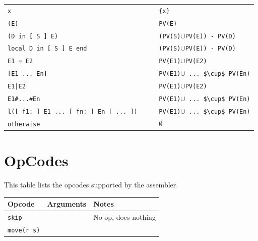 \documentclass[a4paper]{memoir}
\begin{document}
\begin{appendices}
\begin{tabular} {l l}
\lstinline!x                                       ! & \lstinline!{x} !                                   \\
\lstinline!(E)                                     ! & \lstinline!PV(E) !                                    \\
\lstinline!(D in [ S ] E)                          ! & \lstinline[mathescape]!(PV(S)!$\cup$\lstinline!PV(E)) - PV(D) !\\
\lstinline!local D in [ S ] E end                  ! & \lstinline[mathescape]!(PV(S)!$\cup$\lstinline!PV(E)) - PV(D) !\\
\lstinline!E1 = E2                                 ! & \lstinline[mathescape]!PV(E1)!$\cup$\lstinline!PV(E2)         !\\
\lstinline![E1 ... En]                             ! & \lstinline[mathescape]!PV(E1)!$\cup$\lstinline[mathescape]! ... $\cup$ PV(En)!\\
\lstinline!E1|E2                                   ! & \lstinline[mathescape]!PV(E1)!$\cup$\lstinline!PV(E2)         !\\
\lstinline!E1#...#En                             ! & \lstinline[mathescape]!PV(E1)!$\cup$\lstinline[mathescape]! ... $\cup$ PV(En)!\\
\lstinline!l([ f1: ] E1 ... [ fn: ] En [ ... ])    ! & \lstinline[mathescape]!PV(E1)!$\cup$\lstinline[mathescape]! ... $\cup$ PV(En)!\\
\lstinline!otherwise                               ! &              $\emptyset$                               \\
\end{tabular}

\openany

\chapter{OpCodes}\label{appendix:opcodes}
This table lists the opcodes supported by the assembler. \\

\begin{tabular} {p{4cm}p{4cm}p{5cm}}
Opcode & Arguments& Notes \\
\hline
\lstinline!skip! & & No-op, does nothing\\

\hline 
\lstinline!move(r s)! & 


\end{tabular}
\end{appendices}
\end{document}
